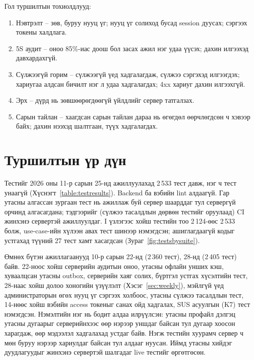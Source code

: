 Гол туршилтын тохиолдлууд:
\begin{enumerate}[label=(\alph*)]
    \item Нэвтрэлт -- зөв, буруу нууц үг; нууц үг солиход бусад session дуусах; сэргээх токены халдлага.
    \item 5S аудит -- оноо 85\%-иас доош бол засах ажил нэг удаа үүсэх; дахин илгээхэд давхардахгүй.
    \item Сүлжээгүй горим -- сүлжээгүй үед хадгалагдаж, сүлжээ сэргэхэд илгээгдэх; хариугаа алдсан бичилт нэг л удаа хадгалагдах; 4xx хариуг дахин илгээхгүй.
    \item Эрх -- дүрд нь зөвшөөрөгдөөгүй үйлдлийг сервер татгалзах.
    \item Сарын тайлан -- хаагдсан сарын тайлан дараа нь өгөгдөл өөрчлөгдсөн ч хэвээр байх; дахин нээхэд шалтгаан, түүх хадгалагдах.
\end{enumerate}

\section{Туршилтын үр дүн}
\label{sec:testresults}
Тестийг 2026 оны 11-р сарын 25-нд ажиллуулахад 2\,533 тест давж, нэг ч тест унаагүй (Хүснэгт~\ref{table:testresults}). Backend ба вэбийн lint алдаагүй. Гар утасны алгассан зургаан тест нь ажиллаж буй сервер шаарддаг тул сервергүй орчинд алгасагдана; тэдгээрийг (сүлжээ тасалдлын дөрвөн тестийг оруулаад) CI жинхэнэ сервертэй ажиллуулдаг. I үзлэгээс хойш тестийн тоо 2\,124-өөс 2\,533 болж, use-case-ийн хүлээн авах тест шинээр нэмэгдсэн; ашиглагдаагүй кодыг устгахад түүний 27 тест хамт хасагдсан (Зураг~\ref{fig:testsbysuite}).

Өмнөх бүтэн ажиллагаанууд 10-р сарын 22-нд (2\,360 тест), 28-нд (2\,405 тест) байв. 22-ноос хойш серверийн аудитын оноо, утасны офлайн унших кэш, хуваалцсан утасны outbox, серверийн хаяг солих, бүртгэл устгах хүсэлтийн тест, 28-наас хойш долоо хоногийн үзүүлэлт (Хэсэг~\ref{sec:weekly}), мэйлгүй үед администраторын өгөх нууц үг сэргээх холбоос, утасны сүлжээ тасалдлын тест, 14-нөөс хойш вэбийн access токеныг санах ойд хадгалах, SUS асуулгын (K7) тест нэмэгдсэн. Нэмэлтийн нэг нь бодит алдаа илрүүлсэн: утасны профайл дэлгэц утасны дугаарыг серверийнхээс өөр нэрээр уншдаг байсан тул дугаар хоосон харагдаж, өөр мэдээлэл хадгалахад устдаг байв. Нэгж тестийн хуурамч сервер ч мөн буруу нэрээр хариулдаг байсан тул алдааг нуусан. Иймд утасны хийдэг дуудлагуудыг жинхэнэ сервертэй шалгадаг live тестийг өргөтгөсөн.

